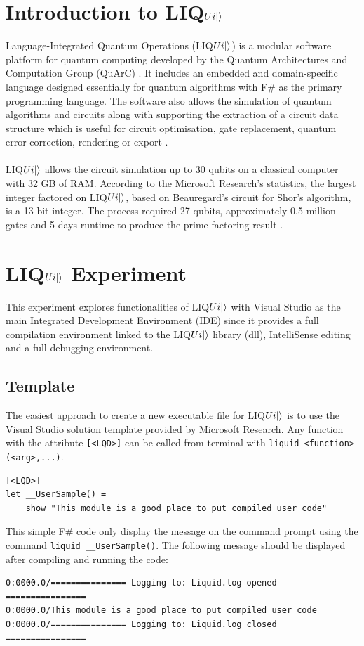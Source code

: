 \documentclass[12pt]{third-rep}
\begin{document}
\section{Introduction to LIQ$Ui{\left\vert{}\right\rangle}$}
Language-Integrated Quantum Operations (LIQ$Ui{\left\vert{}\right\rangle}$) is a modular software platform for quantum computing developed by the Quantum Architectures and Computation Group (QuArC) \cite{liquid-overview}. It includes an embedded and domain-specific language designed essentially for quantum algorithms with F\# as the primary programming language. The software also allows the simulation of quantum algorithms and circuits along with supporting the extraction of a circuit data structure which is useful for circuit optimisation, gate replacement, quantum error correction, rendering or export \cite{liquid-overview,liquid}. \\\\
LIQ$Ui{\left\vert{}\right\rangle}$ allows the circuit simulation up to 30 qubits on a classical computer with 32 GB of RAM. According to the Microsoft Research's statistics, the largest integer factored on LIQ$Ui{\left\vert{}\right\rangle}$, based on Beauregard's circuit for Shor's algorithm, is a 13-bit integer. The process required 27 qubits, approximately 0.5 million gates and 5 days runtime to produce the prime factoring result \cite{liquid-overview}.

\section{LIQ$Ui{\left\vert{}\right\rangle}$ Experiment}
This experiment explores functionalities of LIQ$Ui{\left\vert{}\right\rangle}$ with Visual Studio as the main Integrated Development Environment (IDE) since it provides a full compilation environment linked to the LIQ$Ui{\left\vert{}\right\rangle}$ library (dll), IntelliSense editing and a full debugging environment.

\subsection{Template}
The easiest approach to create a new executable file for LIQ$Ui{\left\vert{}\right\rangle}$ is to use the Visual Studio solution template provided by Microsoft Research. Any function with the attribute \texttt{[<LQD>]} can be called from terminal with \texttt{liquid <function>(<arg>,...)}.
\begin{verbatim}
[<LQD>]
let __UserSample() =
    show "This module is a good place to put compiled user code"
\end{verbatim}
This simple F\# code only display the message on the command prompt using the command \texttt{liquid \_\_UserSample()}. The following message should be displayed after compiling and running the code: \\
\begin{verbatim}
0:0000.0/=============== Logging to: Liquid.log opened ================
0:0000.0/This module is a good place to put compiled user code
0:0000.0/=============== Logging to: Liquid.log closed ================
\end{verbatim}
\end{document}
